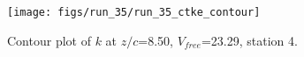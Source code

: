 \begin{figure}[H]
\centering
\texttt{[image: figs/run\_35/run\_35\_ctke\_contour]}
\caption{Contour plot of $k$ at $z/c$=8.50, $V_{free}$=23.29, station 4.}
\label{fig:run_35_ctke_contour}
\end{figure}



